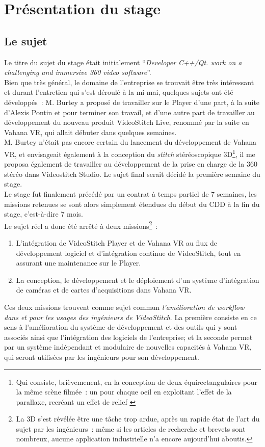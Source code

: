 \chapter{Présentation du stage}

\section{Le sujet}
\label{le-sujet}
Le titre du sujet du stage était initialement \enquote{\textit{Developer C++/Qt.
work on a challenging and immersive 360 video software}}.\\
Bien que très général, le domaine de l'entreprise se trouvait être très intéressant
et durant l'entretien qui s'est déroulé à la mi-mai, quelques sujets ont été
développés~: M. Burtey a proposé de travailler sur le Player d'une part,
à la suite d'Alexis Pontin et pour terminer son travail, et d'une autre part de
travailler au développement du nouveau produit VideoStitch Live, renommé par la
suite en Vahana VR, qui allait débuter dans quelques semaines.\\
M. Burtey n'était pas encore certain du lancement du développement de Vahana VR, 
et envisageait également à la conception du \textit{stitch} stéréoscopique 3D\footnote{Qui
consiste, brièvemenent, en la conception de deux équirectangulaires pour la même
scène filmée~: un pour chaque oeil en exploitant l'effet de la parallaxe, recréant 
un effet de relief\cite{videostitch-stereo}
\cite{image-stereoscopique}}, il me proposa également de travailler au développement
de la prise en charge de la 360 stéréo dans Videostitch Studio. Le sujet final serait
décidé la première semaine du stage.\\
\newline
Le stage fut finalement précédé par un contrat à temps partiel de 7 semaines, les missions retenues
se sont alors simplement étendues du début du CDD à la fin du stage, c'est-à-dire 
7 mois.\\
Le sujet réel a donc été arrêté à deux missions\footnote{La 3D s'est révélée être 
une tâche trop ardue, après un rapide état de l'art du sujet par les ingénieurs~: 
même si les articles de recherche et brevets sont nombreux, aucune application 
industrielle n'a encore aujourd'hui aboutis.}~:
\begin{enumerate}
  \item L'intégration de VideoStitch Player et de Vahana VR au flux de développement
  logiciel et d'intégration continue de VideoStitch, tout en assurant une maintenance sur le Player.
  \item La conception, le développement et le déploiement d'un système
  d'intégration de caméras et de cartes d'acquisitions dans Vahana VR.
\end{enumerate}
Ces deux missions trouvent comme sujet commun \emph{l'amélioration de \textit{workflow}
dans et pour les usages des ingénieurs de VideoStitch}. La première consiste en 
ce sens à l'amélioration du système de développement et des outils qui y sont associés ainsi que l'intégration des logiciels
de l'entreprise; et la seconde permet par un système indépendant et modulaire de
nouvelles capacités à Vahana VR, qui seront utilisées par les ingénieurs pour son développement.

